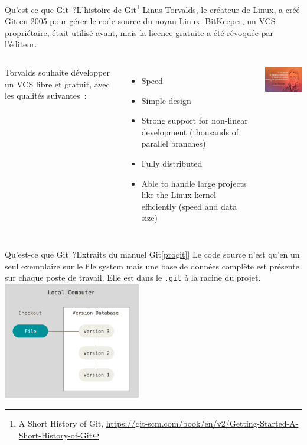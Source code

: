 \documentclass{beamer}
\begin{document}
    \begin{frame}{Qu'est-ce que Git~?}{L'histoire de Git\footnote{A Short History of Git, \url{https://git-scm.com/book/en/v2/Getting-Started-A-Short-History-of-Git}}}
        \transdissolve
        Linus Torvalds, le créateur de Linux, a créé Git en 2005 pour gérer le code source du noyau Linux.
        BitKeeper, un VCS propriétaire, était utilisé avant, mais la licence gratuite a été révoquée par l'éditeur.
        \smallbreak
        \begin{columns}
            Torvalds souhaite développer un VCS libre et gratuit, avec les qualités suivantes~:
            \begin{itemize}
                \item Speed
                \item Simple design
                \item Strong support for non-linear development (thousands of parallel branches)
                \item Fully distributed
                \item Able to handle large projects like the Linux kernel efficiently (speed and data size)
            \end{itemize}
            \centering
            \includegraphics[width=4.5cm]{image/linus-quote.jpeg}
        \end{columns}
    \end{frame}

    \begin{frame}{Qu'est-ce que Git~?}{Extraits du manuel Git\cref{progit}]}
        \transdissolve
        Le code source n'est qu'en un seul exemplaire sur le file system mais une base de données complète est présente sur chaque poste de travail.
        Elle est dans le \lstinline{.git} à la racine du projet.
        \bigbreak
        \centering
        \includegraphics[width=6cm]{image/git-local-history}
    \end{frame}
\end{document}
